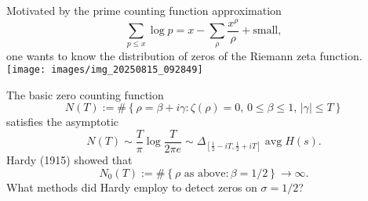\documentclass[reqno]{amsart} 
\begin{document}
Motivated by the prime counting function approximation
\begin{equation*}
  \sum_{p \leq x} \log p = x - \sum_\rho \frac{x^\rho}{\rho} + \mathrm{small},
\end{equation*}
one wants to know the distribution of zeros of the Riemann zeta function.
\texttt{[image: images/img\_20250815\_092849]}

The basic zero counting function
\begin{equation*}
  N(T) := \# \left\{ \rho = \beta + i \gamma : \zeta(\rho) = 0, \, 0 \leq \beta \leq 1, \, \lvert \gamma \rvert \leq T \right\}
\end{equation*}
satisfies the asymptotic
\begin{equation*}
  N(T) \sim \frac{T}{\pi} \log \frac{T}{2 \pi e}
  \sim \Delta_{[\frac{1}{2} - i T, \frac{1}{2} + i T]} \operatorname{avg} H(s).
\end{equation*}
Hardy (1915) showed that
\begin{equation*}
  N_0(T) := \# \left\{ \rho \text{ as above} : \beta = 1/2 \right\}
  \rightarrow \infty.
\end{equation*}
What methods did Hardy employ to detect zeros on $\sigma = 1/2$?
\end{document}
